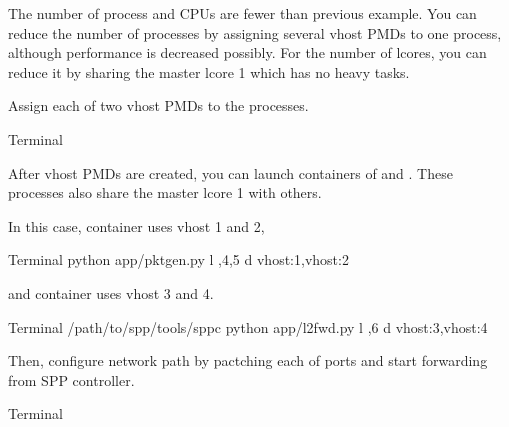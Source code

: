 \documentclass[a4paper,11pt,openany,oneside,english]{sphinxmanual}
\begin{document}
The number of process and CPUs are fewer than previous example.
You can reduce the number of  processes by assigning
several vhost PMDs to one process, although performance is decreased
possibly.
For the number of lcores, you can reduce it by sharing
the master lcore 1 which has no heavy tasks.

Assign each of two vhost PMDs to the processes.

\begin{sphinxVerbatim}[commandchars=\\\{\},formatcom=\footnotesize]
 Terminal 
\end{sphinxVerbatim}

After vhost PMDs are created, you can launch containers
of  and .
These processes also share the master lcore 1 with others.

In this case,  container uses vhost 1 and 2,

\begin{sphinxVerbatim}[commandchars=\\\{\},formatcom=\footnotesize]
 Terminal 
 python app/pktgen.py \PYGZhy{}l ,4,5 \PYGZhy{}d vhost:1,vhost:2
\end{sphinxVerbatim}

and  container uses vhost 3 and 4.

\begin{sphinxVerbatim}[commandchars=\\\{\},formatcom=\footnotesize]
 Terminal 
  /path/to/spp/tools/sppc
 python app/l2fwd.py \PYGZhy{}l ,6 \PYGZhy{}d vhost:3,vhost:4
\end{sphinxVerbatim}

Then, configure network path by pactching each of ports
and start forwarding from SPP controller.

\begin{sphinxVerbatim}[commandchars=\\\{\},formatcom=\footnotesize]
 Terminal 
\end{sphinxVerbatim}
\end{document}
